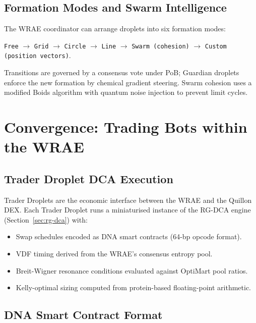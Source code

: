 \documentclass[12pt,a4paper]{article}
\begin{document}
\subsection{Formation Modes and Swarm Intelligence}

The WRAE coordinator can arrange droplets into six formation modes:

\begin{center}
\texttt{Free} $\to$ \texttt{Grid} $\to$ \texttt{Circle} $\to$ \texttt{Line}
$\to$ \texttt{Swarm (cohesion)} $\to$ \texttt{Custom (position vectors)}.
\end{center}

Transitions are governed by a consensus vote under PoB; Guardian droplets
enforce the new formation by chemical gradient steering.  Swarm cohesion uses
a modified Boids algorithm with quantum noise injection to prevent limit
cycles.

\section{Convergence: Trading Bots within the WRAE}
\label{sec:convergence}

\subsection{Trader Droplet DCA Execution}

Trader Droplets are the economic interface between the WRAE and the Quillon DEX.
Each Trader Droplet runs a miniaturised instance of the RG-DCA engine
(Section~\ref{sec:rg-dca}) with:
\begin{itemize}
\item Swap schedules encoded as DNA smart contracts (64-bp opcode format).
\item VDF timing derived from the WRAE's consensus entropy pool.
\item Breit-Wigner resonance conditions evaluated against OptiMart pool ratios.
\item Kelly-optimal sizing computed from protein-based floating-point arithmetic.
\end{itemize}

\subsection{DNA Smart Contract Format}
\end{document}
